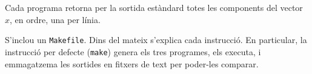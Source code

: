 \documentclass[12pt]{article}
\begin{document}
Cada programa retorna per la sortida estàndard totes les components del vector
$x$, en ordre, una per línia.

S'inclou un \texttt{Makefile}. Dins del mateix s'explica cada instrucció.
En particular, la instrucció per defecte (\texttt{make}) genera els tres
programes, els executa, i emmagatzema les sortides en fitxers de text per
poder-les comparar.
\end{document}
